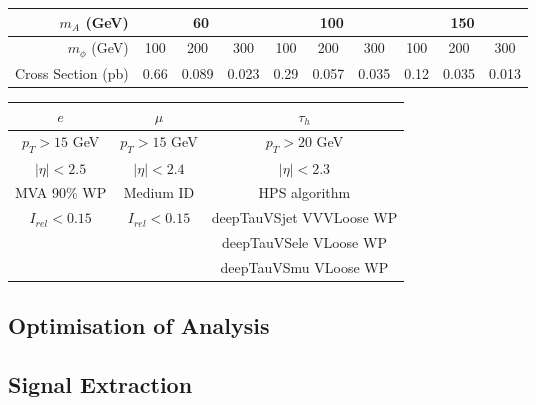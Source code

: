 \begin{table}[]
\begin{tabular}{|r||ccc|ccc|ccc|}
\hline
$m_{A}$ (GeV)      & \multicolumn{3}{c|}{60}                                   & \multicolumn{3}{c|}{100}                                  & \multicolumn{3}{c|}{150}                                  \\ \hline
$m_{\phi}$ (GeV)   & \multicolumn{1}{c|}{100} & \multicolumn{1}{c|}{200} & 300 & \multicolumn{1}{c|}{100} & \multicolumn{1}{c|}{200} & 300 & \multicolumn{1}{c|}{100} & \multicolumn{1}{c|}{200} & 300 \\ \hline
Cross Section (pb) & \multicolumn{1}{c|}{0.66}    & \multicolumn{1}{c|}{0.089}    &    0.023 & \multicolumn{1}{c|}{0.29}    & \multicolumn{1}{c|}{0.057}    &  0.035   & \multicolumn{1}{c|}{0.12}    & \multicolumn{1}{c|}{0.035}    & 0.013    \\ \hline
\end{tabular}
\end{table}


\begin{table}[]
\begin{tabular}{|c|c|c|}
\hline
$e$ & $\mu$ &  $\tau_{h}$ \\
\hline
\hline
$p_{T} > 15$ GeV & $p_{T} > 15$ GeV & $p_{T} > 20$ GeV \\
$|\eta| < 2.5$ & $|\eta| < 2.4$ & $|\eta| < 2.3$ \\
MVA 90\% WP & Medium ID & HPS algorithm \\
$I_{rel} < 0.15$ & $I_{rel} < 0.15$ & deepTauVSjet VVVLoose WP \\
& & deepTauVSele VLoose WP \\
& & deepTauVSmu VLoose WP \\
\hline
\end{tabular}
\end{table}

\subsection{Optimisation of Analysis}

\subsection{Signal Extraction}

